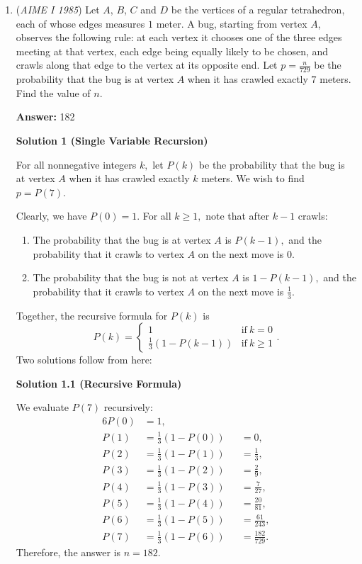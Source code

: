 \begin{enumerate}
 


 


	\item (\textit{AIME I 1985}) Let $A$, $B$, $C$ and $D$ be the vertices of a regular tetrahedron, each of whose edges measures $1$ meter. A bug, starting from vertex $A$, observes the following rule: at each vertex it chooses one of the three edges meeting at that vertex, each edge being equally likely to be chosen, and crawls along that edge to the vertex at its opposite end. Let $p = \frac{n}{729}$ be the probability that the bug is at vertex $A$ when it has crawled exactly $7$ meters. Find the value of $n$.


 
 \textbf{Answer: }182



\textbf{Solution 1 (Single Variable Recursion)}

For all nonnegative integers $k,$ let $P(k)$ be the probability that the bug is at vertex $A$ when it has crawled exactly $k$ meters. We wish to find $p=P(7).$

 Clearly, we have $P(0)=1.$ For all $k\geq1,$ note that after $k-1$ crawls:

 
            \begin{enumerate} 
        \item The probability that the bug is at vertex $A$ is $P(k-1),$ and the probability that it crawls to vertex $A$ on the next move is $0.$

        \item The probability that the bug is not at vertex $A$ is $1-P(k-1),$ and the probability that it crawls to vertex $A$ on the next move is $\frac13.$

            \end{enumerate}
            Together, the recursive formula for $P(k)$ is
 \[P(k) = \begin{cases} 1 & \mathrm{if} \ k=0 \\ \frac13(1-P(k-1)) & \mathrm{if} \ k\geq1 \end{cases}.\]Two solutions follow from here:

 



\textbf{Solution 1.1 (Recursive Formula)}

We evaluate $P(7)$ recursively:
 \begin{alignat*}{6} P(0)&=1, \\ P(1)&=\frac13(1-P(0))&&=0, \\ P(2)&=\frac13(1-P(1))&&=\frac13, \\ P(3)&=\frac13(1-P(2))&&=\frac29, \\ P(4)&=\frac13(1-P(3))&&=\frac{7}{27}, \\ P(5)&=\frac13(1-P(4))&&=\frac{20}{81}, \\ P(6)&=\frac13(1-P(5))&&=\frac{61}{243},\\ P(7)&=\frac13(1-P(6))&&=\frac{182}{729}. \end{alignat*}Therefore, the answer is $n=\boxed{182}.$





\end{enumerate}
